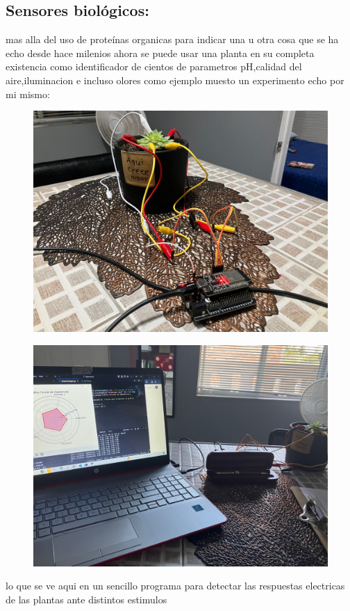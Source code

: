 \documentclass[twocolumn]{article}
\begin{document}
\subsection{Sensores biológicos:}mas alla del uso de proteínas organicas para indicar una u otra cosa que se ha echo desde hace milenios
ahora se puede usar una planta en su completa existencia como identificador de cientos de parametros pH,calidad del aire,iluminacion e incluso olores
como ejemplo muesto un experimento echo por mi mismo:
\begin{figure}
    \centering
    \includegraphics[width=\linewidth]{imagenes/b2600f88-8219-4305-a7c7-ee62c7193031.jpeg}
\end{figure}

\begin{figure}
    \centering
    \includegraphics[width=\linewidth]{imagenes/2345deaa-69d8-4df1-ac8e-003b1e7546ac.jpeg}
\end{figure}
lo que se ve aqui en un sencillo programa para detectar las respuestas electricas de las plantas
ante distintos estimulos
\end{document}
